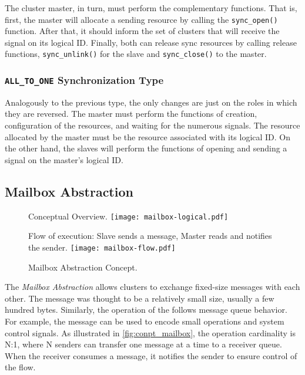 					The cluster master, in turn, must perform the complementary functions.
					That is, first, the master will allocate a sending resource by calling
					the \texttt{sync\_open()} function.
					After that, it should inform the set of clusters that will receive the
					signal on its logical ID.
					Finally, both can release sync resources by calling release functions,
					\texttt{sync\_unlink()} for the slave and \texttt{sync\_close()} to
					the master.

				\subsubsection*{\texttt{ALL\_TO\_ONE} Synchronization Type}

					Analogously to the previous type, the only changes are just on
					the roles in which they are reversed.
					The master must perform the functions of creation, configuration
					of the resources, and waiting for the numerous signals.
					The resource allocated by the master must be the resource
					associated with its logical ID.
					On the other hand, the slaves will perform the functions of
					opening and sending a signal on the master's logical ID.

		\subsection{Mailbox Abstraction}
		\label{sec.mailbox-abs}

			\begin{figure}[!tb]
				\centering%
				\caption{Mailbox Abstraction Concept.}%
				\label{fig:conpt_mailbox}%

					{Conceptual Overview.}%
					{\texttt{[image: mailbox-logical.pdf]}}%

				\hfill

					{Flow of execution: Slave sends a message, Master reads and notifies the sender.}%
					{\texttt{[image: mailbox-flow.pdf]}}%

			\end{figure}


			The \textit{Mailbox Abstraction} allows clusters to exchange fixed-size
			messages with each other.
			The message was thought to be a relatively small size, usually a few hundred bytes.
			Similarly, the operation of the \mailbox follows \posix message queue behavior.
			For example, the message can be used to encode small operations and system
			control signals.
			As illustrated in \autoref{fig:conpt_mailbox}, the operation cardinality is N:1,
			where N senders can transfer one message at a time to a receiver queue.
			When the receiver consumes a message, it notifies the sender to ensure
			control of the flow.

